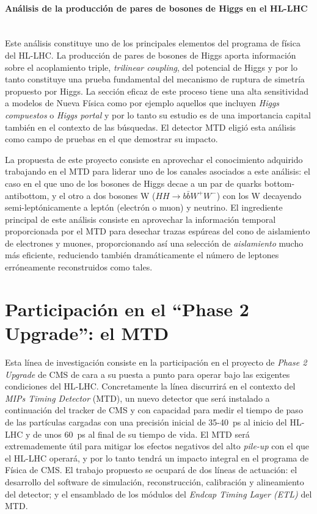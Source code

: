 \paragraph{Análisis de la producción de pares de bosones de Higgs en el HL-LHC\\\\}

Este análisis constituye uno de los principales elementos del programa de física del HL-LHC. La producción de pares de bosones de Higgs aporta información sobre el acoplamiento triple, \emph{trilinear coupling}, del potencial de Higgs y por lo tanto constituye una prueba fundamental del mecanismo de ruptura de simetría propuesto por Higgs. La sección eficaz de este proceso tiene una alta sensitividad a modelos de Nueva Física como por ejemplo aquellos que incluyen \emph{Higgs compuestos} o \emph{Higgs portal} y por lo tanto su estudio es de una importancia capital también en el contexto de las búsquedas. El detector MTD eligió esta análisis como campo de pruebas en el que demostrar su impacto. 

La propuesta de este proyecto consiste en aprovechar el conocimiento adquirido trabajando en el MTD para liderar uno de los canales asociados a este análisis: el caso en el que uno de los bosones de Higgs decae a un par de quarks bottom-antibottom, y el otro a dos bosones W ($HH\rightarrow b\bar{b}W^+W^-$) con los W decayendo semi-leptónicamente a leptón (electrón o muon) y neutrino. El ingrediente principal de este análisis consiste en aprovechar la información temporal proporcionada por el MTD para desechar trazas espúreas del cono de aislamiento de electrones y muones, proporcionando así una selección de \emph{aislamiento} mucho más eficiente, reduciendo también dramáticamente el número de leptones erróneamente reconstruidos como tales.


\section{Participación en el ``Phase 2 Upgrade'': el MTD}

Esta línea de investigación consiste en la participación en el proyecto de \emph{Phase 2 Upgrade} de CMS de cara a su puesta a punto para operar bajo las exigentes condiciones del HL-LHC. Concretamente la línea discurrirá en el contexto del \emph{MIPs Timing Detector} (MTD), un nuevo detector que será instalado a continuación del tracker de CMS y con capacidad para medir el tiempo de paso de las partículas cargadas con una precisión inicial de 35-40~ps al inicio del HL-LHC y de unos 60~ps al final de su tiempo de vida. El MTD será extremademente útil para mitigar los efectos negativos del alto \emph{pile-up} con el que el HL-LHC operará, y por lo tanto tendrá un impacto integral en el programa de Física de CMS. El trabajo propuesto se ocupará de dos líneas de actuación: el desarrollo del software de simulación, reconstrucción, calibración y alineamiento del detector; y el ensamblado de los módulos del \emph{Endcap Timing Layer (ETL)} del MTD.

